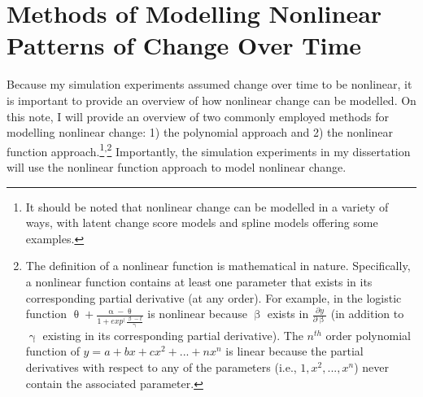 \documentclass[
12pt, %
twoside,
english]{guelphthesis}
\begin{document}
\hypertarget{modelling-change}{%
\section{Methods of Modelling Nonlinear Patterns of Change Over Time}\label{modelling-change}}

Because my simulation experiments assumed change over time to be nonlinear, it is important to provide an overview of how nonlinear change can be modelled. On this note, I will provide an overview of two commonly employed methods for modelling nonlinear change: 1) the polynomial approach and 2) the nonlinear function approach.\footnote{It should be noted that nonlinear change can be modelled in a variety of ways, with latent change score models \parencite[e.g., ][]{orourke2021} and spline models \parencite[e.g., ][]{fine2020} offering some examples.}\textsuperscript{,}\footnote{The definition of a nonlinear function is mathematical in nature. Specifically, a nonlinear function contains at least one parameter that exists in its corresponding partial derivative (at any order). For example, in the logistic function $\uptheta + \frac{\upalpha - \uptheta}{1 + exp^(\frac{\upbeta - t}{\upgamma}}$ is nonlinear because $\upbeta$ exists in $\frac{\partial y}{\partial \upbeta}$ (in addition to $\upgamma$ existing in its corresponding partial derivative). The $n^{th}$ order polynomial function of $y = a + bx + cx^2 + ... + nx^n$ is linear because the partial derivatives with respect to any of the parameters (i.e., $1, x^2, ..., x^n$) never contain the associated parameter.} Importantly, the simulation experiments in my dissertation will use the nonlinear function approach to model nonlinear change.
\end{document}
